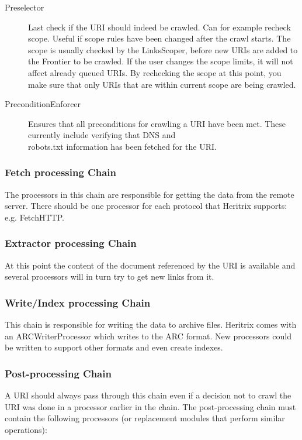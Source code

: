 \documentclass[11pt,a4paper]{article}
\begin{document}
\begin{description}
\item[Preselector] Last check if the URI should indeed be crawled. Can for example recheck scope. Useful if scope rules have been changed after the crawl starts. The scope is usually checked by the LinksScoper, before new URIs are added to the Frontier to be crawled. If the user changes the scope limits, it will not affect already queued URIs. By rechecking the scope at this point, you make sure that only URIs that are within current scope are being crawled.
\item[PreconditionEnforcer] Ensures that all preconditions for crawling a URI have been met. These currently include verifying that DNS and \\robots.txt information has been fetched for the URI.
\end{description}

\subsubsection{Fetch processing Chain}
The processors in this chain are responsible for getting the data from the remote server. There should be one processor for each protocol that Heritrix supports: e.g. FetchHTTP.

\subsubsection{Extractor processing Chain}
At this point the content of the document referenced by the URI is available and several processors will in turn try to get new links from it.

\subsubsection{Write/Index processing Chain}
This chain is responsible for writing the data to archive files. Heritrix comes with an ARCWriterProcessor which writes to the ARC format. New processors could be written to support other formats and even create indexes.

\subsubsection{Post-processing Chain}
A URI should always pass through this chain even if a decision not to crawl the URI was done in a processor earlier in the chain. The post-processing chain must contain the following processors (or replacement modules that perform similar operations):
\end{document}
